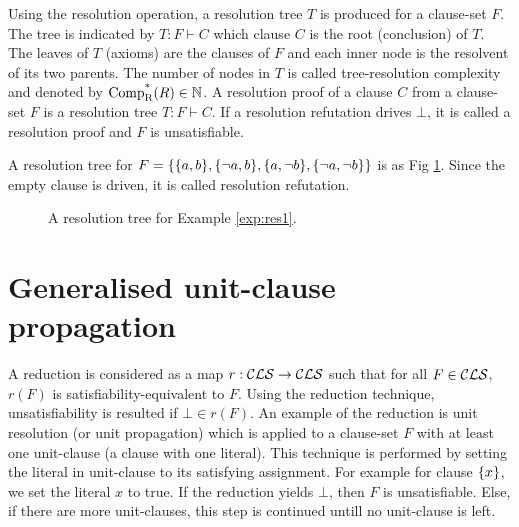 \documentclass[]{book}
\begin{document}
Using the resolution operation, a resolution tree $T$ is produced for a clause-set $F$. The tree is indicated by $T : F \vdash C$ which clause $C$ is the root (conclusion) of $T$. The leaves of $T$ (axioms) are the clauses of $F$ and each inner node is the resolvent of its two parents. The number of nodes in $T$ is called tree-resolution complexity and denoted by $\operatorname{\operatorname{Comp}_{R}^*}(R) \in \mathbb{N}$. A resolution proof of a clause $C$ from a clause-set $F$ is a resolution tree $T : F \vdash C$. If a resolution refutation drives $\bot$, it is called a resolution proof and $F$ is unsatisfiable.

\begin{examp}\label{exp:res1}
A resolution tree for $F = \{ \{ a,b \},\{ \neg a,b \},\{ a, \neg b \},\{ \neg a, \neg b \} \}$ is as Fig \ref{fig:resol1}. Since the empty clause is driven, it is called resolution refutation.
	   \begin{figure}
	   \centering  
	   \caption{A resolution tree for Example \ref{exp:res1}.}
	   \label{fig:resol1}
       \end{figure}
\end{examp}

\section{Generalised unit-clause propagation}
\label{sec:rkred}

A reduction is considered as a map $r: \mathcal{CLS} \rightarrow \mathcal{CLS}$ such that for all $F \in \mathcal{CLS}$, $r(F)$ is satisfiability-equivalent to $F$. Using the reduction technique, unsatisfiability is resulted if $\bot \in r(F)$. An example of the reduction is unit resolution (or unit propagation) which is applied to a clause-set $F$ with at least one unit-clause (a clause with one literal). This technique is performed by setting the literal in unit-clause to its satisfying assignment. For example for clause $\{ x \}$, we set the literal $x$ to true. If the reduction yields $\bot$, then $F$ is unsatisfiable. Else, if there are more unit-clauses, this step is continued untill no unit-clause is left.
\end{document}
